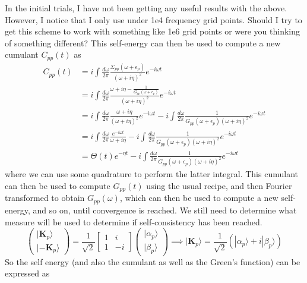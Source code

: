 In the initial trials, I have not been getting any useful results with the above. However, I notice that I only use under 1e4 frequency grid points. Should I try to get this scheme to work with something like 1e6 grid points or were you thinking of something different?
\newpage
This self-energy can then be used to compute a new cumulant $C_{pp}(t)$ as
\begin{align}
    C_{pp}(t) &= i \int \frac{d\omega}{2\pi} \frac{ \Sigma_{pp}\left(\omega+\epsilon_p\right)}{(\omega + i \eta)^2} e^{-i \omega t} \\
&= i \int \frac{d\omega}{2\pi} \frac{\omega + i \eta - \frac{1}{G_{pp}(\omega + \epsilon_p)}}{(\omega + i \eta)^2} e^{-i \omega t} \\
&= i \int \frac{d\omega}{2\pi} \frac{\omega + i \eta}{(\omega + i \eta)^2} e^{-i \omega t} - i \int \frac{d\omega}{2\pi} \frac{1}{G_{pp}(\omega + \epsilon_p)(\omega + i \eta)^2} e^{-i \omega t} \\
&= i \int \frac{d\omega}{2\pi} \frac{e^{-i \omega t}}{\omega + i \eta} - i \int \frac{d\omega}{2\pi} \frac{1}{G_{pp}(\omega + \epsilon_p)(\omega + i \eta)^2} e^{-i \omega t} \\
&= \Theta(t)e^{-\eta t} - i \int \frac{d\omega}{2\pi} \frac{1}{G_{pp}(\omega + \epsilon_p)(\omega + i \eta)^2} e^{-i \omega t}
\end{align}
where we can use some quadrature to perform the latter integral. This cumulant can then be used to compute $G_{pp}(t)$ using the usual recipe, and then Fourier transformed to obtain $G_{pp}(\omega)$, which can then be used to compute a new self-energy, and so on, until convergence is reached. We still need to determine what measure will be used to determine if self-consistency has been reached.
\begin{equation}
    \begin{pmatrix}
|{\bm{K}_p}\rangle \\
|{\bm{-K}_p}\rangle
    \end{pmatrix}
= \frac{1}{\sqrt{2}} \begin{bmatrix}
1 & i \\
1 & -i
\end{bmatrix}
\begin{pmatrix}
|\alpha_p\rangle \\
|\beta_p\rangle
\end{pmatrix}
\implies |\bm{K}_p\rangle = \frac{1}{\sqrt{2}} \left( |\alpha_p\rangle + i |\beta_p\rangle \right)
\end{equation} 
So the self energy (and also the cumulant as well as the Green's function) can be expressed as
